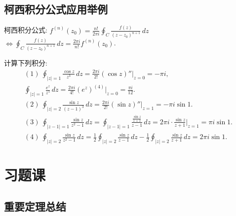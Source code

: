 \documentclass[theorem=false,mathfont=none,openany,sub3section]{easybook}
\begin{document}
\subsection{柯西积分公式应用举例}

柯西积分公式: $f^{(n)}(z_{0})=\frac{n!}{2\pi i}\oint_{C}\frac{f(z)}{(z-z_{0})^{n+1}}\,dz$
$\Leftrightarrow\oint_{C}\frac{f(z)}{(z-z_{0})^{n+1}}\,dz=\frac{2\pi i}{n!}f^{(n)}(z_{0})$.

\begin{example}
  计算下列积分:
  \[
  \begin{array}{l}
  (1)\ \displaystyle\oint_{|z|=1}\frac{\cos z}{z^{3}}\,dz
  =\frac{2\pi i}{2!}(\cos z)''\big|_{z=0}=-\pi i,\\[4pt]
  \displaystyle\oint_{|z|=1}\frac{e^{z}}{z^{5}}\,dz
  =\frac{2\pi i}{4!}(e^{z})^{(4)}\big|_{z=0}=\frac{\pi i}{12}.\\[8pt]
  (2)\ \displaystyle\oint_{|z|=2}\frac{\sin z}{(z-1)^{3}}\,dz
  =\frac{2\pi i}{2!}(\sin z)''\big|_{z=1}=-\pi i\sin 1.\\[8pt]
  (3)\ \displaystyle\oint_{|z-1|=1}\frac{\sin z}{z^{2}-1}\,dz
  =\oint_{|z-1|=1}\frac{\frac{\sin z}{z+1}}{z-1}\,dz
  =2\pi i\cdot\frac{\sin z}{z+1}\Big|_{z=1}=\pi i\sin 1.\\[8pt]
  (4)\ \displaystyle\oint_{|z|=2}\frac{\sin z}{z^{2}-1}\,dz
  =\frac{1}{2}\oint_{|z|=2}\frac{\sin z}{z-1}\,dz
  -\frac{1}{2}\oint_{|z|=2}\frac{\sin z}{z+1}\,dz
  =2\pi i\sin 1.
  \end{array}
  \]
\end{example}

\newpage

\section{习题课}

\subsection{重要定理总结}
\end{document}

